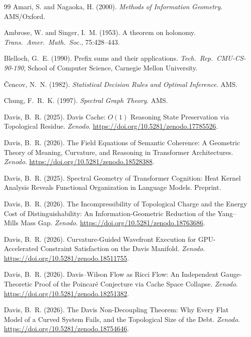 \documentclass[11pt,a4paper]{article}
\theoremstyle{definition}
\theoremstyle{remark}
\begin{document}
\begin{thebibliography}{99}
 Amari, S. and Nagaoka, H. (2000). 
\emph{Methods of Information Geometry}. AMS/Oxford.

 Ambrose, W. and Singer, I.~M. (1953). 
A theorem on holonomy. \emph{Trans.\ Amer.\ Math.\ Soc.}, 
75:428--443.

 Blelloch, G.~E. (1990). Prefix sums and 
their applications. \emph{Tech.\ Rep.\ CMU-CS-90-190}, School of 
Computer Science, Carnegie Mellon University.

 \v{C}encov, N.~N. (1982). 
\emph{Statistical Decision Rules and Optimal Inference}. AMS.

 Chung, F.~R.~K. (1997). 
\emph{Spectral Graph Theory}. AMS.

 Davis, B.~R. (2025). Davis Cache: $O(1)$ 
Reasoning State Preservation via Topological Residue. 
\emph{Zenodo}. \url{https://doi.org/10.5281/zenodo.17785526}.

 Davis, B.~R. (2026). The Field 
Equations of Semantic Coherence: A Geometric Theory of Meaning, 
Curvature, and Reasoning in Transformer Architectures. 
\emph{Zenodo}. \url{https://doi.org/10.5281/zenodo.18528388}.

 Davis, B.~R. (2025). Spectral 
Geometry of Transformer Cognition: Heat Kernel Analysis Reveals 
Functional Organization in Language Models. Preprint.

 Davis, B.~R. (2026). The 
Incompressibility of Topological Charge and the Energy Cost of 
Distinguishability: An Information-Geometric Reduction of the 
Yang--Mills Mass Gap. \emph{Zenodo}. 
\url{https://doi.org/10.5281/zenodo.18763686}.

 Davis, B.~R. (2026). 
Curvature-Guided Wavefront Execution for GPU-Accelerated 
Constraint Satisfaction on the Davis Manifold. \emph{Zenodo}. 
\url{https://doi.org/10.5281/zenodo.18511755}.

 Davis, B.~R. (2026). Davis--Wilson 
Flow as Ricci Flow: An Independent Gauge-Theoretic Proof of the 
Poincar\'e Conjecture via Cache Space Collapse. \emph{Zenodo}. 
\url{https://doi.org/10.5281/zenodo.18251382}.

 Davis, B.~R. (2026). The Davis 
Non-Decoupling Theorem: Why Every Flat Model of a Curved System 
Fails, and the Topological Size of the Debt. \emph{Zenodo}. 
\url{https://doi.org/10.5281/zenodo.18754646}.


\end{thebibliography}
\end{document}
